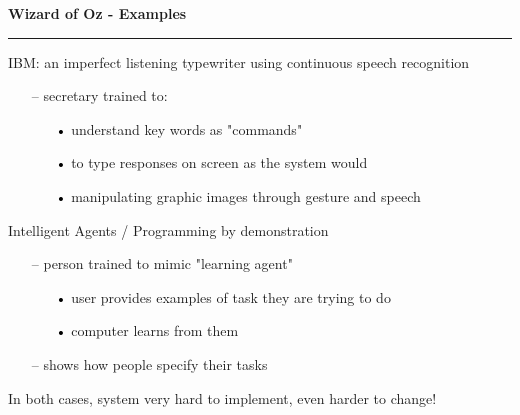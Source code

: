 \documentclass[pdf]{beamer}
\begin{document}
\begin{frame}
\vspace{8mm}
\textcolor{myBlue}{\textbf{\Large{Wizard of Oz - Examples}}}

\textcolor{red}{\rule{10cm}{1mm}}

\bigskip
{\Large IBM: an imperfect listening typewriter using continuous speech recognition}

	\begin{itemize}
      \item[\textcolor{black}{--}] secretary trained to:
      \begin{itemize}
        \item[\textcolor{black}{•}] understand key words as "commands"
        \item[\textcolor{black}{•}] to type responses on screen as the system would
        \item[\textcolor{black}{•}] manipulating graphic images through gesture and speech
      \end{itemize}
  \end{itemize}
  
 \bigskip
{\Large Intelligent Agents / Programming by demonstration}

\begin{itemize}
      \item[\textcolor{black}{--}] person trained to mimic "learning agent"
      \begin{itemize}
        \item[\textcolor{black}{•}] user provides examples of task they are trying to do
        \item[\textcolor{black}{•}]computer learns from them
      \end{itemize}
      \item[\textcolor{black}{--}] shows how people specify their tasks
\end{itemize}

 \bigskip
 {\Large In both cases, system very hard to implement, even harder to change!} 
\end{frame}
\end{document}
